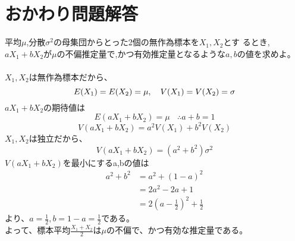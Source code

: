 \documentclass[a4j,uplatex,dvipdfmx]{jsarticle}
\begin{document}
\section*{おかわり問題解答}
平均$\mu$,分散$\sigma ^2$の母集団からとった2個の無作為標本を$X_1,X_2$とす
るとき,$aX_1+bX_2$が$\mu$の不偏推定量で,かつ有効推定量となるような$a,b$の値を求めよ。\\
\\
$X_1,X_2$は無作為標本だから、
\begin{equation}
  E(X_1)=E(X_2)=\mu,~~~V(X_1)=V(X_2)=\sigma \\
\end{equation}
$aX_1+bX_2$の期待値は
\begin{equation}
  E(aX_1+bX_2)=\mu ~~~~ \therefore a+b=1 
\end{equation}
\begin{equation}
  V(aX_1+bX_2)=a^2 V(X_1)+b^2V(X_2)
\end{equation}
$X_1,X_2$は独立だから、
\begin{equation}
  V(aX_1+bX_2)=(a^2+b^2)\sigma ^2
\end{equation}
$V(aX_1+bX_2)$を最小にするa,bの値は
\begin{equation}
  \begin{split}
    a^2+b^2&=a^2+(1-a)^2\\
    &=2a^2-2a+1\\
    &=2\left( a-\frac{1}{2} \right)^2 + \frac{1}{2}
  \end{split}
\end{equation}
より、$a=\frac{1}{2},b=1-a=\frac{1}{2}$である。\\
よって、標本平均$\frac{X_1+X_2}{2}$は$\mu$の不偏で、かつ有効な推定量である。
\end{document}

